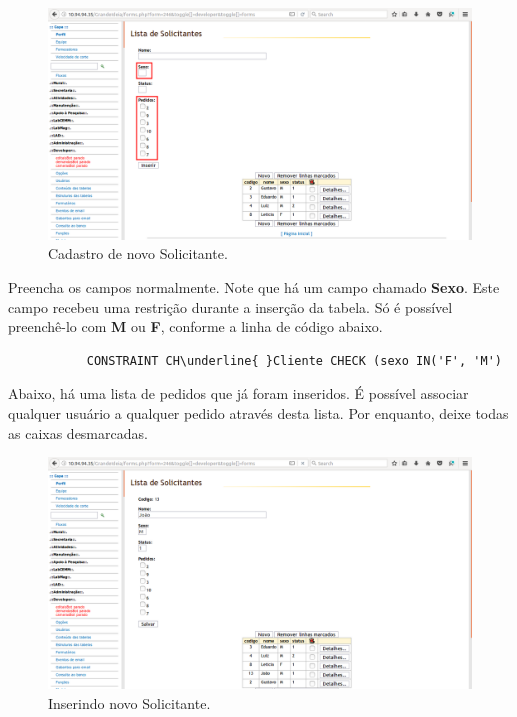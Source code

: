 \documentclass[9pt]{report}
\begin{document}
{       \begin{figure}[H]
        \includegraphics[width=\textwidth]{2_Formularios/4_Relacionamento_N_N/43.png}
        \caption{Cadastro de novo Solicitante.}
        \label{fig:formsolicitadd}
       \end{figure}

       Preencha os campos normalmente. Note que há um campo chamado
       \textbf{Sexo}. Este campo recebeu uma restrição durante a
       inserção da tabela. Só é possível preenchê-lo com \textbf{M}
       ou \textbf{F}, conforme a linha de código abaixo.
       
       \begin{lstlisting}        
           CONSTRAINT CH\underline{ }Cliente CHECK (sexo IN('F', 'M')
       \end{lstlisting}

       Abaixo, há uma lista de pedidos que já foram inseridos. É
       possível associar qualquer usuário a qualquer pedido através
       desta lista. Por enquanto, deixe todas as caixas desmarcadas.

       \begin{figure}[H]
        \includegraphics[width=\textwidth]{2_Formularios/4_Relacionamento_N_N/44.png}
        \caption{Inserindo novo Solicitante.}
        \label{fig:formsolicitadddados}
       \end{figure}

}
\end{document}
